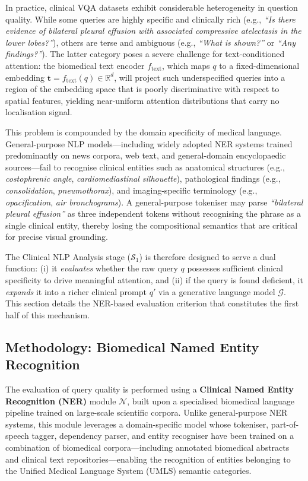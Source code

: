 In practice, clinical VQA datasets exhibit considerable heterogeneity in question quality. While some queries are highly specific and clinically rich (e.g., \textit{``Is there evidence of bilateral pleural effusion with associated compressive atelectasis in the lower lobes?''}), others are terse and ambiguous (e.g., \textit{``What is shown?''} or \textit{``Any findings?''}). The latter category poses a severe challenge for text-conditioned attention: the biomedical text encoder $f_{\text{text}}$, which maps $q$ to a fixed-dimensional embedding $\mathbf{t} = f_{\text{text}}(q) \in \mathbb{R}^d$, will project such underspecified queries into a region of the embedding space that is poorly discriminative with respect to spatial features, yielding near-uniform attention distributions that carry no localisation signal.

This problem is compounded by the domain specificity of medical language. General-purpose NLP models---including widely adopted NER systems trained predominantly on news corpora, web text, and general-domain encyclopaedic sources---fail to recognise clinical entities such as anatomical structures (e.g., \textit{costophrenic angle}, \textit{cardiomediastinal silhouette}), pathological findings (e.g., \textit{consolidation}, \textit{pneumothorax}), and imaging-specific terminology (e.g., \textit{opacification}, \textit{air bronchograms}). A general-purpose tokeniser may parse \textit{``bilateral pleural effusion''} as three independent tokens without recognising the phrase as a single clinical entity, thereby losing the compositional semantics that are critical for precise visual grounding.

The Clinical NLP Analysis stage ($\mathcal{S}_1$) is therefore designed to serve a dual function: (i) it \textit{evaluates} whether the raw query $q$ possesses sufficient clinical specificity to drive meaningful attention, and (ii) if the query is found deficient, it \textit{expands} it into a richer clinical prompt $q'$ via a generative language model $\mathcal{G}$. This section details the NER-based evaluation criterion that constitutes the first half of this mechanism.

\subsection{Methodology: Biomedical Named Entity Recognition}
\label{sec:3_2_2}
The evaluation of query quality is performed using a \textbf{Clinical Named Entity Recognition (NER)} module $\mathcal{N}$, built upon a specialised biomedical language pipeline trained on large-scale scientific corpora. Unlike general-purpose NER systems, this module leverages a domain-specific model whose tokeniser, part-of-speech tagger, dependency parser, and entity recogniser have been trained on a combination of biomedical corpora---including annotated biomedical abstracts and clinical text repositories---enabling the recognition of entities belonging to the Unified Medical Language System (UMLS) semantic categories.

